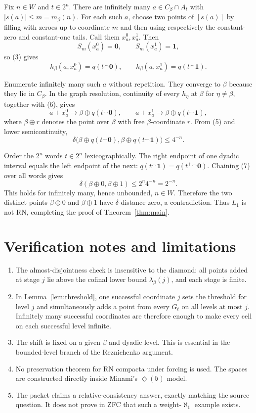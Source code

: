 \documentclass[11pt]{article}
\newcommand{\concat}{\mathbin{{}^\frown}}
\begin{document}
Fix $n\in W$ and $t\in2^n$.  There are infinitely many
$a\in C_\beta\cap A_t$ with $|s(a)|\le m=m_\beta(n)$.  For each such $a$, choose
two points of $[s(a)]$ by filling with zeroes up to coordinate $m$ and then
using respectively the constant-zero and constant-one tails.  Call them
$x_a^0,x_a^1$.  Then
\[
 S_m(x_a^0)=\mathbf0,\qquad S_m(x_a^1)=\mathbf1,
\]
so (3) gives
\[
 h_\beta(a,x_a^0)=q(t\concat\mathbf0),\qquad
 h_\beta(a,x_a^1)=q(t\concat\mathbf1).
\tag{6}
\]

Enumerate infinitely many such $a$ without repetition.  They converge to
$\beta$ because they lie in $C_\beta$.  In the graph resolution, continuity
of every $h_\eta$ at $\beta$ for $\eta\ne\beta$, together with (6), gives
\[
 a+x_a^0\longrightarrow \beta\oplus q(t\concat\mathbf0),\qquad
 a+x_a^1\longrightarrow \beta\oplus q(t\concat\mathbf1),
\]
where $\beta\oplus r$ denotes the point over $\beta$ with free
$\beta$-coordinate $r$.  From (5) and lower semicontinuity,
\[
 \delta\bigl(\beta\oplus q(t\concat\mathbf0),
              \beta\oplus q(t\concat\mathbf1)\bigr)\le4^{-n}.
\tag{7}
\]

Order the $2^n$ words $t\in2^n$ lexicographically.  The right endpoint of one
dyadic interval equals the left endpoint of the next:
$q(t\concat\mathbf1)=q(t^+\concat\mathbf0)$.  Chaining (7) over all words gives
\[
             \delta(\beta\oplus0,\beta\oplus1)
             \le 2^n4^{-n}=2^{-n}.
\]
This holds for infinitely many, hence unbounded, $n\in W$.  Therefore the two
distinct points $\beta\oplus0$ and $\beta\oplus1$ have $\delta$-distance zero,
a contradiction.  Thus $L_1$ is not RN, completing the proof of
Theorem~\ref{thm:main}.

\section{Verification notes and limitations}

\begin{enumerate}
\item The almost-disjointness check is insensitive to the diamond: all points
added at stage $j$ lie above the cofinal lower bound $\lambda_\beta(j)$, and
each stage is finite.
\item In Lemma~\ref{lem:threshold}, one successful coordinate $j$ sets the
threshold for level $j$ and simultaneously adds a point from every $G_t$ on
all levels at most $j$.  Infinitely many successful coordinates are therefore
enough to make every cell on each successful level infinite.
\item The shift is fixed on a given $\beta$ and dyadic level.  This is essential
in the bounded-level branch of the Reznichenko argument.
\item No preservation theorem for RN compacta under forcing is used.  The
spaces are constructed directly inside Minami's $\Diamond(\mathfrak b)$ model.
\item The packet claims a relative-consistency answer, exactly matching the
source question.  It does not prove in ZFC that such a weight-$\aleph_1$
example exists.
\end{enumerate}
\end{document}
